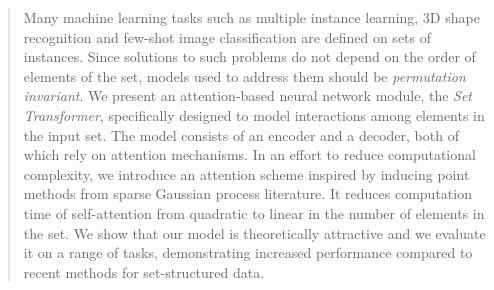 \documentclass{article}
\begin{document}



\printAffiliationsAndNotice{}  %

\begin{abstract}
Many machine learning tasks such as multiple instance learning, 3D shape recognition and few-shot image classification are defined on sets of instances.
Since solutions to such problems do not depend on the order of elements of the set, models used to address them should be \textit{permutation invariant}.
We present an attention-based neural network module, the \textit{Set Transformer}, specifically designed to model interactions among elements in the input set.
The model consists of an encoder and a decoder, both of which rely on attention mechanisms.
In an effort to reduce computational complexity, we introduce an attention scheme inspired by inducing point methods from sparse Gaussian process literature.
It reduces computation time of self-attention from quadratic to linear in the number of elements in the set.
We show that our model is theoretically attractive and we evaluate it on a range of tasks, demonstrating increased performance compared to recent methods for set-structured data.
\end{abstract}
\end{document}
